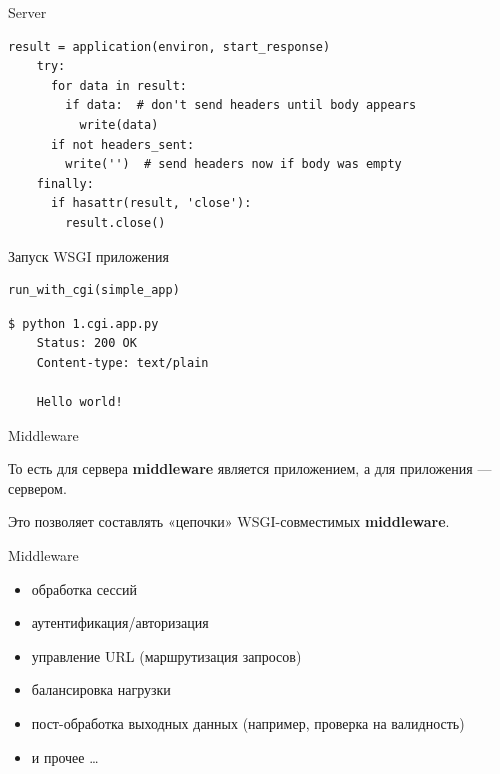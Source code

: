 \begin{frame}[fragile]{Server}

    \begin{lstlisting}[style=python]
    result = application(environ, start_response)
    try:
      for data in result:
        if data:  # don't send headers until body appears
          write(data)
      if not headers_sent:
        write('')  # send headers now if body was empty
    finally:
      if hasattr(result, 'close'):
        result.close()
    \end{lstlisting}

\end{frame}

\begin{frame}[fragile]{Запуск WSGI приложения}

    \begin{lstlisting}[style=python]
    run_with_cgi(simple_app)
    \end{lstlisting}

    \begin{lstlisting}[style=python]
    $ python 1.cgi.app.py
    Status: 200 OK
    Content-type: text/plain

    Hello world!
    \end{lstlisting}

\end{frame}

\begin{frame}{Middleware}

    То есть для сервера \textbf{middleware} является приложением, а для
    приложения — сервером.

    Это позволяет составлять «цепочки» WSGI-совместимых \textbf{middleware}.

\end{frame}

\begin{frame}{Middleware}

    \begin{itemize}
        \item обработка сессий
        \item аутентификация/авторизация
        \item управление URL (маршрутизация запросов)
        \item балансировка нагрузки
        \item пост-обработка выходных данных (например, проверка на валидность)
        \item и прочее \ldots
    \end{itemize}

\end{frame}

